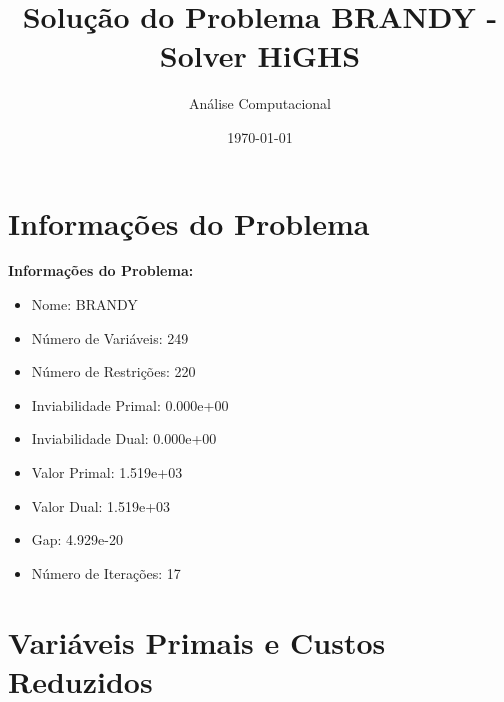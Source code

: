 \documentclass[12pt]{article}
\title{Solução do Problema BRANDY - Solver HiGHS}
\author{Análise Computacional}
\date{\today}
\begin{document}
\maketitle

\section{Informações do Problema}

\textbf{Informações do Problema:}
\begin{itemize}
\item Nome: BRANDY
\item Número de Variáveis: 249
\item Número de Restrições: 220
\item Inviabilidade Primal: 0.000e+00
\item Inviabilidade Dual: 0.000e+00
\item Valor Primal: 1.519e+03
\item Valor Dual: 1.519e+03
\item Gap: 4.929e-20
\item Número de Iterações: 17
\end{itemize}


\section{Variáveis Primais e Custos Reduzidos}
\end{document}
